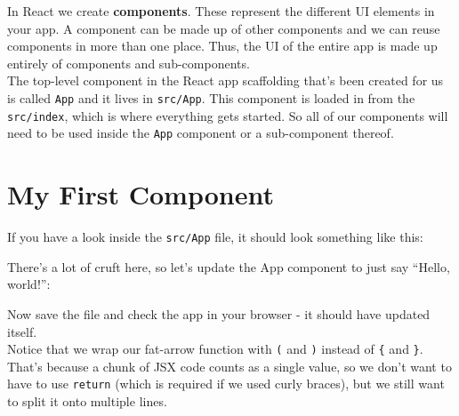 In React we create \textbf{components}. These represent the different UI elements in your app. A component can be made up of other components and we can reuse components in more than one place. Thus, the UI of the entire app is made up entirely of components and sub-components.
\\

The top-level component in the React app scaffolding that's been created for us is called \texttt{App} and it lives in \texttt{src/App}. This component is loaded in from the \texttt{src/index}, which is where everything gets started. So all of our components will need to be used inside the \texttt{App} component or a sub-component thereof.


\pagebreak


\section{My First Component}

If you have a look inside the \texttt{src/App} file, it should look something like this:


There's a lot of cruft here, so let's update the App component to just say ``Hello, world!'':


Now save the file and check the app in your browser - it should have updated itself.
\\

Notice that we wrap our fat-arrow function with \texttt{(} and \texttt{)} instead of \texttt{\{} and \texttt{\}}. That's because a chunk of JSX code counts as a single value, so we don't want to have to use \texttt{return} (which is required if we used curly braces), but we still want to split it onto multiple lines.
\\

